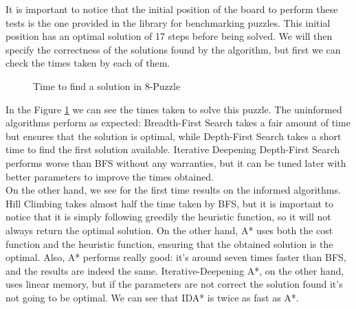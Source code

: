 It is important to notice that the initial position of the board to perform
these tests is the one provided in the library for benchmarking puzzles. This
initial position has an optimal solution of 17 steps before being solved. We
will then specify the correctness of the solutions found by the algorithm, but
first we can check the times taken by each of them.\\

\begin{figure}[!htbp]
  \centering
  \caption{Time to find a solution in 8-Puzzle}
  \label{8p:time}
\end{figure}

In the Figure \ref{8p:time} we can see the times taken to solve this puzzle.
The uninformed algorithms perform as expected: Breadth-First Search takes a
fair amount of time but ensures that the solution is optimal, while Depth-First
Search takes a short time to find the first solution available. Iterative
Deepening Depth-First Search performs worse than BFS without any warranties,
but it can be tuned later with better parameters to improve the times
obtained.\\

On the other hand, we see for the first time results on the informed
algorithms. Hill Climbing takes almost half the time taken by BFS, but it is
important to notice that it is simply following greedily the heuristic
function, so it will not always return the optimal solution. On the other hand,
A* uses both the cost function and the heuristic function, ensuring that the
obtained solution is the optimal. Also, A* performs really good: it's around
seven times faster than BFS, and the results are indeed the same.
Iterative-Deepening A*, on the other hand, uses linear memory, but if the
parameters are not correct the solution found it's not going to be optimal. We
can see that IDA* is twice as fast as A*.\\

